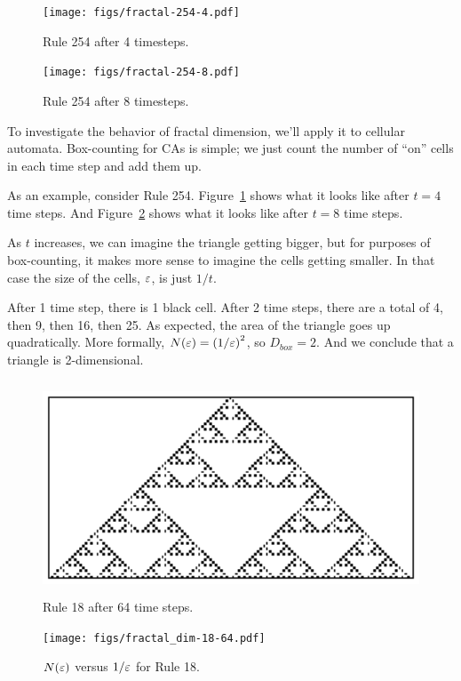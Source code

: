 \documentclass[10pt]{book}
\begin{document}
\begin{figure}
\centerline{\texttt{[image: figs/fractal-254-4.pdf]}}
\caption{Rule 254 after 4 timesteps.\label{fig.rule254.1}}
\end{figure}

\begin{figure}
\centerline{\texttt{[image: figs/fractal-254-8.pdf]}}
\caption{Rule 254 after 8 timesteps.\label{fig.rule254.2}}
\end{figure}

To investigate the behavior of fractal dimension, we'll apply it
to cellular automata.  Box-counting for CAs is simple; we
just count the number of ``on'' cells in each time step and
add them up.

As an example, consider Rule 254.  Figure~\ref{fig.rule254.1} shows
what it looks like after $t=4$ time steps.  And
Figure~\ref{fig.rule254.2} shows what it looks like after $t=8$ time
steps.  

As $t$ increases, we can imagine the triangle getting bigger,
but for purposes of box-counting, it makes more sense to imagine
the cells getting smaller.  In that case the size of the cells,
$\varepsilon$, is just $1/t$.

After 1 time step, there is 1 black cell.  After 2 time steps, there
are a total of 4, then 9, then 16, then 25.  As expected, the area
of the triangle goes up quadratically.  More formally,
$N(\varepsilon) = \left( 1 / \varepsilon \right)^2$, so $D_{box} = 2$.  And we conclude
that a triangle is 2-dimensional.

\begin{figure}
\centerline{\includegraphics[height=2.5in]{figs/rule-18-64.pdf}}
\caption{Rule 18 after 64 time steps.\label{fig.rule18.2}}
\end{figure}

\begin{figure}
\centerline{\texttt{[image: figs/fractal\_dim-18-64.pdf]}}
\caption{$N(\varepsilon)$ versus $1/\varepsilon$ for Rule 18.\label{fig.fractal}}
\end{figure}
\end{document}
